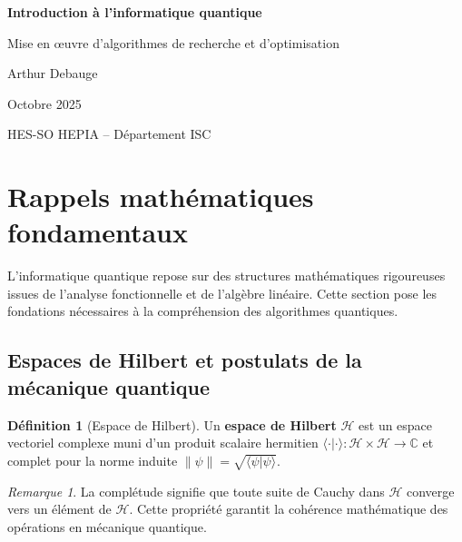 \documentclass[12pt,a4paper]{article}
\theoremstyle{definition}
\newtheorem{definition}[theorem]{Définition}
\theoremstyle{remark}
\newtheorem{remark}[theorem]{Remarque}
\begin{document}
\begin{titlepage}
\centering
\vspace*{2cm}
{\Huge\bfseries Introduction à l'informatique quantique\par}
\vspace{1cm}
{\LARGE Mise en œuvre d'algorithmes de recherche et d'optimisation\par}
\vspace{2cm}
{\Large Arthur Debauge\par}
\vspace{0.5cm}
{\large Octobre 2025\par}
\vfill
{\large HES-SO HEPIA -- Département ISC\par}
\end{titlepage}

\tableofcontents
\newpage

\section{Rappels mathématiques fondamentaux}

L'informatique quantique repose sur des structures mathématiques rigoureuses issues de l'analyse fonctionnelle et de l'algèbre linéaire. Cette section pose les fondations nécessaires à la compréhension des algorithmes quantiques.

\subsection{Espaces de Hilbert et postulats de la mécanique quantique}

\begin{definition}[Espace de Hilbert]
Un \textbf{espace de Hilbert} $\mathcal{H}$ est un espace vectoriel complexe muni d'un produit scalaire hermitien $\langle \cdot | \cdot \rangle : \mathcal{H} \times \mathcal{H} \to \mathbb{C}$ et complet pour la norme induite $\|\psi\| = \sqrt{\langle \psi | \psi \rangle}$.
\end{definition}

\begin{remark}
La complétude signifie que toute suite de Cauchy dans $\mathcal{H}$ converge vers un élément de $\mathcal{H}$. Cette propriété garantit la cohérence mathématique des opérations en mécanique quantique.
\end{remark}
\end{document}
